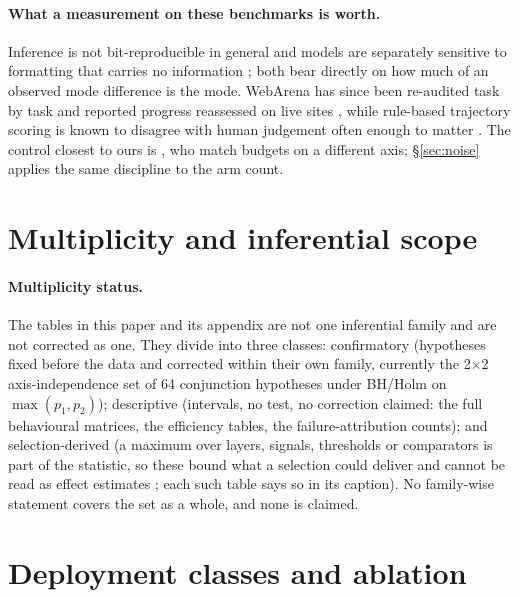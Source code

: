\paragraph{What a measurement on these benchmarks is worth.} Inference is not bit-reproducible in general \citep{he2025nondeterminism,yuan2025numerical} and models are separately sensitive to formatting that carries no information \citep{sclar2024promptformat}; both bear directly on how much of an observed mode difference is the mode. WebArena has since been re-audited task by task \citep{elhattami2025webarenaverified} and reported progress reassessed on live sites \citep{xue2025illusion}, while rule-based trajectory scoring is known to disagree with human judgement often enough to matter \citep{lu2025agentrewardbench}. The control closest to ours is \citet{hajimiri2026budgetmatched}, who match budgets on a different axis; \S\ref{sec:noise} applies the same discipline to the arm count.

\section{Multiplicity and inferential scope}\label{app:multiplicity}

\paragraph{Multiplicity status.} The tables in this paper and its appendix are not one inferential family and are not corrected as one. They divide into three classes: confirmatory (hypotheses fixed before the data and corrected within their own family, currently the 2$\times$2 axis-independence set of 64 conjunction hypotheses under BH/Holm \citep{holm1979sequentially} on $\max(p_1, p_2)$); descriptive (intervals, no test, no correction claimed: the full behavioural matrices, the efficiency tables, the failure-attribution counts); and selection-derived (a maximum over layers, signals, thresholds or comparators is part of the statistic, so these bound what a selection could deliver and cannot be read as effect estimates \citep{cawley2010overfitting}; each such table says so in its caption). No family-wise statement covers the set as a whole, and none is claimed.

\section{Deployment classes and ablation}\label{app:classes}

